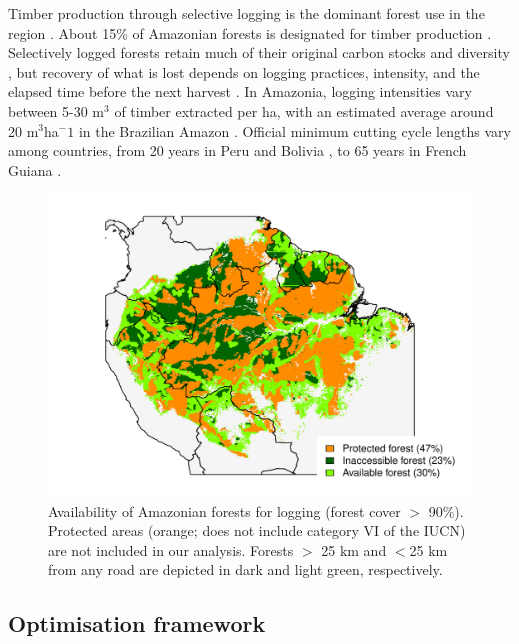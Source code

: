 \documentclass{article}
\begin{document}
Timber production through selective logging is the dominant forest use in the region \cite{Blaser2011}. About 15\% of Amazonian forests is designated for timber production \cite{FAO2011}. Selectively logged forests retain much of their original carbon stocks and diversity \cite{Putz2012}, but recovery of what is lost depends on logging practices, intensity, and the elapsed time before the next harvest \cite{Rutishauser2015,Piponiot2018}. In Amazonia, logging intensities vary between 5-30 m$^3$ of timber extracted per ha, with an estimated average around 20 m$^3$ha$^-1$ in the Brazilian Amazon \cite{Asner2005}. Official minimum cutting cycle lengths vary among countries, from 20 years in Peru and Bolivia \cite{Fredericksen2003,Blaser2011}, to 65 years in French Guiana \cite{Gourlet-Fleury2004}. 

\begin{figure}
    \centering
    \includegraphics[width=\linewidth]{graphs/harv_areas.pdf}
    \caption{Availability of Amazonian forests for logging (forest cover $>$ 90\%). Protected areas (orange; does not include category VI of the IUCN) are not included in our analysis. Forests $>$ 25 km and $<$25 km from any road are depicted in dark and light green, respectively.}
    \label{fig:pharv}
\end{figure}


\subsection{Optimisation framework}
\end{document}
